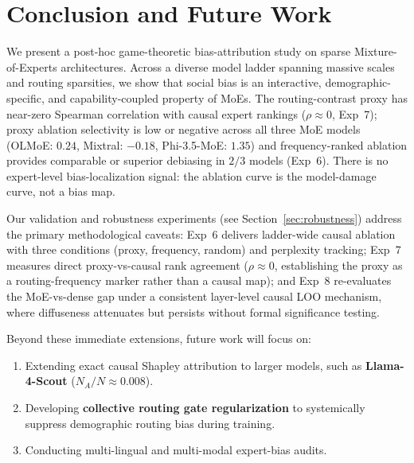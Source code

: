 \documentclass[11pt,a4paper]{article}
\begin{document}
\section{Conclusion and Future Work}
We present a post-hoc game-theoretic bias-attribution study on sparse Mixture-of-Experts architectures. Across a diverse model ladder spanning massive scales and routing sparsities, we show that social bias is an interactive, demographic-specific, and capability-coupled property of MoEs. The routing-contrast proxy has near-zero Spearman correlation with causal expert rankings ($\rho \approx 0$, Exp~7); proxy ablation selectivity is low or negative across all three MoE models (OLMoE: $0.24$, Mixtral: $-0.18$, Phi-3.5-MoE: $1.35$) and frequency-ranked ablation provides comparable or superior debiasing in $2/3$ models (Exp~6). There is no expert-level bias-localization signal: the ablation curve is the model-damage curve, not a bias map.

Our validation and robustness experiments (see Section~\ref{sec:robustness}) address the primary methodological caveats: Exp~6 delivers ladder-wide causal ablation with three conditions (proxy, frequency, random) and perplexity tracking; Exp~7 measures direct proxy-vs-causal rank agreement ($\rho \approx 0$, establishing the proxy as a routing-frequency marker rather than a causal map); and Exp~8 re-evaluates the MoE-vs-dense gap under a consistent layer-level causal LOO mechanism, where diffuseness attenuates but persists without formal significance testing.

Beyond these immediate extensions, future work will focus on:
\begin{enumerate}
    \item Extending exact causal Shapley attribution to larger models, such as \textbf{Llama-4-Scout} ($N_A/N \approx 0.008$).
    \item Developing \textbf{collective routing gate regularization} to systemically suppress demographic routing bias during training.
    \item Conducting multi-lingual and multi-modal expert-bias audits.
\end{enumerate}
\end{document}
